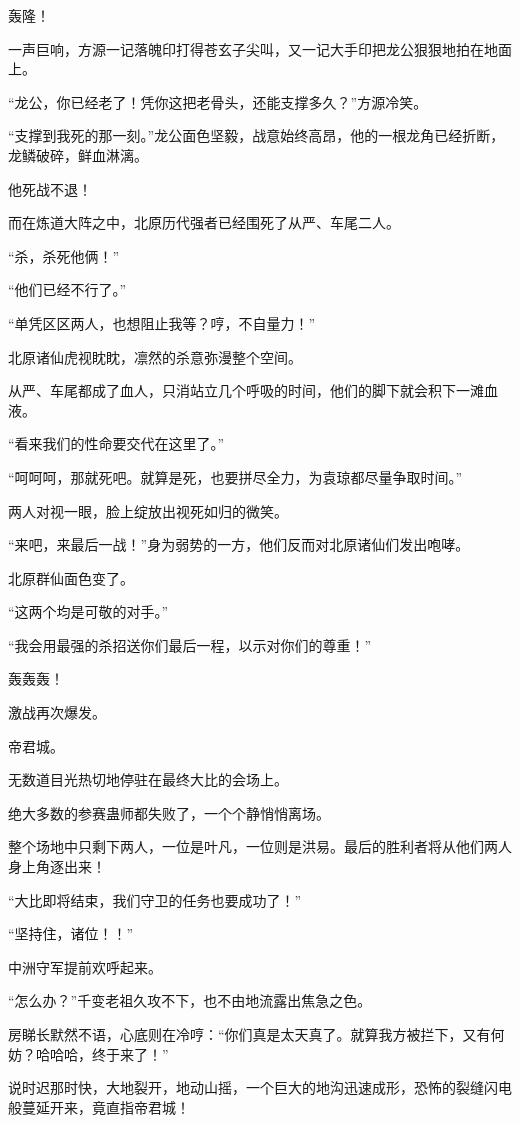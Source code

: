 \begin{this_body}
轰隆！

一声巨响，方源一记落魄印打得苍玄子尖叫，又一记大手印把龙公狠狠地拍在地面上。

“龙公，你已经老了！凭你这把老骨头，还能支撑多久？”方源冷笑。

“支撑到我死的那一刻。”龙公面色坚毅，战意始终高昂，他的一根龙角已经折断，龙鳞破碎，鲜血淋漓。

他死战不退！

而在炼道大阵之中，北原历代强者已经围死了从严、车尾二人。

“杀，杀死他俩！”

“他们已经不行了。”

“单凭区区两人，也想阻止我等？哼，不自量力！”

北原诸仙虎视眈眈，凛然的杀意弥漫整个空间。

从严、车尾都成了血人，只消站立几个呼吸的时间，他们的脚下就会积下一滩血液。

“看来我们的性命要交代在这里了。”

“呵呵呵，那就死吧。就算是死，也要拼尽全力，为袁琼都尽量争取时间。”

两人对视一眼，脸上绽放出视死如归的微笑。

“来吧，来最后一战！”身为弱势的一方，他们反而对北原诸仙们发出咆哮。

北原群仙面色变了。

“这两个均是可敬的对手。”

“我会用最强的杀招送你们最后一程，以示对你们的尊重！”

轰轰轰！

激战再次爆发。

帝君城。

无数道目光热切地停驻在最终大比的会场上。

绝大多数的参赛蛊师都失败了，一个个静悄悄离场。

整个场地中只剩下两人，一位是叶凡，一位则是洪易。最后的胜利者将从他们两人身上角逐出来！

“大比即将结束，我们守卫的任务也要成功了！”

“坚持住，诸位！！”

中洲守军提前欢呼起来。

“怎么办？”千变老祖久攻不下，也不由地流露出焦急之色。

房睇长默然不语，心底则在冷哼：“你们真是太天真了。就算我方被拦下，又有何妨？哈哈哈，终于来了！”

说时迟那时快，大地裂开，地动山摇，一个巨大的地沟迅速成形，恐怖的裂缝闪电般蔓延开来，竟直指帝君城！


\end{this_body}

